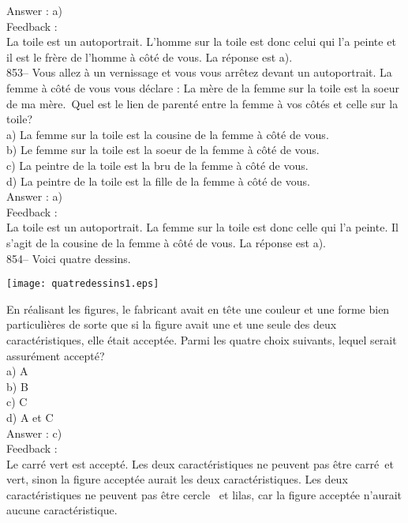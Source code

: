 ﻿\documentclass[letterpaper, 12pt]{article}
\begin{document}
Answer : a)\\

Feedback :\\
La toile est un autoportrait.  L'homme sur la toile est donc celui qui l'a
peinte et il est le fr\`ere de l'homme \`a c\^ot\'e de vous.  La r\'eponse
est a).\\

853-- Vous allez \`a un vernissage et vous vous arr\^etez devant un
autoportrait.  La femme \`a c\^ot\'e de vous vous d\'eclare : \og La
m\`ere de la femme sur la toile est la soeur de ma m\`ere.\fg\  Quel
est le lien de parent\'e entre la femme \`a vos c\^ot\'es et celle sur la toile?\\
a) La femme sur la toile est la cousine de la femme \`a c\^ot\'e de vous.\\
b) Le femme sur la toile est la soeur de la femme \`a c\^ot\'e de vous.\\
c) La peintre de la toile est la bru de la femme \`a c\^ot\'e de vous.\\
d) La peintre de la toile est la fille de la femme \`a c\^ot\'e de vous.\\

Answer : a)\\

Feedback : \\
La toile est un autoportrait.  La femme sur la toile est donc celle qui l'a
peinte.  Il s'agit de la cousine de la femme \`a c\^ot\'e de vous.  La
r\'eponse est a).\\

854-- Voici quatre dessins.
    \begin{center}
    \texttt{[image: quatredessins1.eps]}
    \end{center}

En r\'ealisant les figures, le fabricant avait en t\^ete une couleur et une
forme bien particuli\`eres de sorte que si la figure avait une et une seule
des deux caract\'eristiques, elle \'etait accept\'ee.  Parmi les quatre
choix suivants, lequel serait assur\'ement accept\'e?\\
a) A\\
b) B\\
c) C\\
d) A et C\\

Answer : c)\\

Feedback : \\
Le carr\'e vert est accept\'e.  Les deux caract\'eristiques ne
peuvent pas \^etre \og carr\'e\fg\ et \og vert\fg , sinon la figure
accept\'ee aurait les deux caract\'eristiques.  Les deux
caract\'eristiques ne peuvent pas \^etre \og cercle \fg\ et \og
lilas\fg , car la figure accept\'ee n'aurait aucune caract\'eristique. \\
\end{document}

